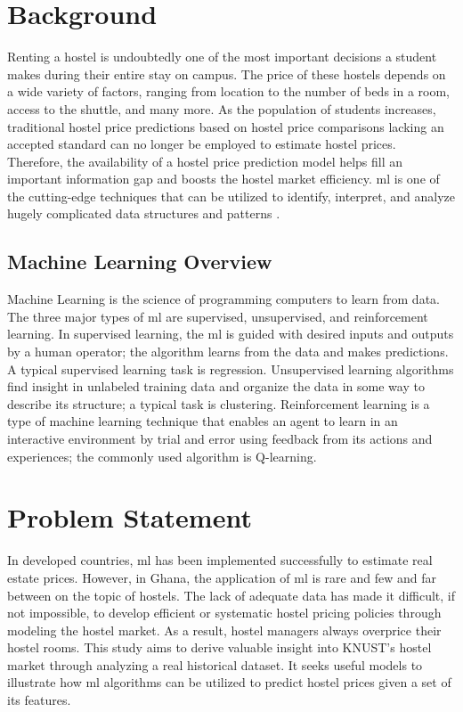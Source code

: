 
\begin{sloppypar}

		\section{Background}
		Renting a hostel is undoubtedly one of the most important decisions a student makes during their entire stay on campus. The price of these hostels depends on a wide variety of factors, ranging from location to the number of beds in a room, access to the shuttle, and many more. As the population of students increases, traditional hostel price predictions based on hostel price comparisons lacking an accepted standard can no longer be employed to estimate hostel prices. Therefore, the availability of a hostel price prediction model helps fill an important information gap \citep{Calhoun2003} and boosts the hostel market efficiency. \ac{ml} is one of the cutting-edge techniques that can be utilized to identify, interpret, and analyze hugely complicated data structures and patterns \citep{Ngiam2019}.
		
		\subsection{Machine Learning Overview}
		Machine Learning \citep{Douglass2020} is the science of programming computers to learn from data. The three major types of \ac{ml} are supervised, unsupervised, and reinforcement learning. In supervised learning, the \ac{ml} is guided with desired inputs and outputs by a human operator; the algorithm learns from the data and makes predictions. A typical supervised learning task is regression. Unsupervised learning algorithms find insight in unlabeled training data and organize the data in some way to describe its structure; a typical task is clustering. Reinforcement learning \citep{Youplus2018} is a type of machine learning technique that enables an agent to learn in an interactive environment by trial and error using feedback from its actions and experiences; the commonly used algorithm is Q-learning.
		
		
		\section{Problem Statement}
		In developed countries, \ac{ml} has been implemented successfully to estimate real estate prices. However, in Ghana, the application of \ac{ml} is rare and few and far between on the topic of hostels. The lack of adequate data \citep{Owusu-Ansah2012} has made it difficult, if not impossible, to develop efficient or systematic hostel pricing policies through modeling the hostel market. As a result, hostel managers always overprice their hostel rooms. This study aims to derive valuable insight into KNUST's hostel market through analyzing a real historical dataset. It seeks useful models to illustrate how \ac{ml} algorithms can be utilized to predict hostel prices given a set of its features.
		

\end{sloppypar}
